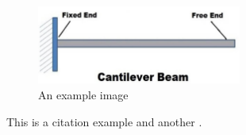 \documentclass{article}
\begin{document}
\begin{figure}[ht]
    \centering
    \includegraphics[width=0.6\textwidth]{Cantilever Beam Image.png}
    \caption{An example image}
    \label{fig:example}
\end{figure}

This is a citation example \cite{smith2020} and another \cite{doe2018}.
\end{document}
